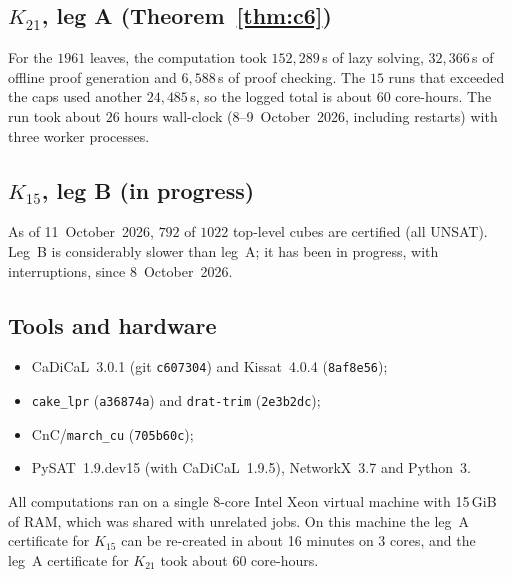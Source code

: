 \documentclass[11pt]{amsart}
\theoremstyle{definition}
\theoremstyle{remark}
\begin{document}
\subsection*{$K_{21}$, leg A (Theorem~\ref{thm:c6})}
For the $1961$ leaves, the computation took $152{,}289$\,s of lazy solving, $32{,}366$\,s of offline proof generation and $6{,}588$\,s of
proof checking. The $15$ runs that exceeded the caps used another $24{,}485$\,s, so the logged total is about $60$ core-hours. The run
took about $26$ hours wall-clock (8--9~October~2026, including restarts) with three worker processes.

\subsection*{$K_{15}$, leg B (in progress)}
As of 11~October~2026, $792$ of $1022$ top-level cubes are certified (all UNSAT). Leg~B is considerably slower than leg~A; it has been in
progress, with interruptions, since 8~October~2026.

\subsection*{Tools and hardware}
\begin{itemize}
\item CaDiCaL~3.0.1 (git \texttt{c607304}) and Kissat~4.0.4 (\texttt{8af8e56});
\item \texttt{cake\_lpr} (\texttt{a36874a}) and \texttt{drat-trim} (\texttt{2e3b2dc});
\item CnC/\texttt{march\_cu} (\texttt{705b60c});
\item PySAT~1.9.dev15 (with CaDiCaL~1.9.5), NetworkX~3.7 and Python~3.
\end{itemize}
All
computations ran on a single 8-core Intel Xeon virtual machine with 15\,GiB of RAM, which was shared with unrelated jobs. On this machine
the leg~A certificate for $K_{15}$ can be re-created in about 16 minutes on 3 cores, and the leg~A certificate for $K_{21}$ took about 60
core-hours.
\end{document}
